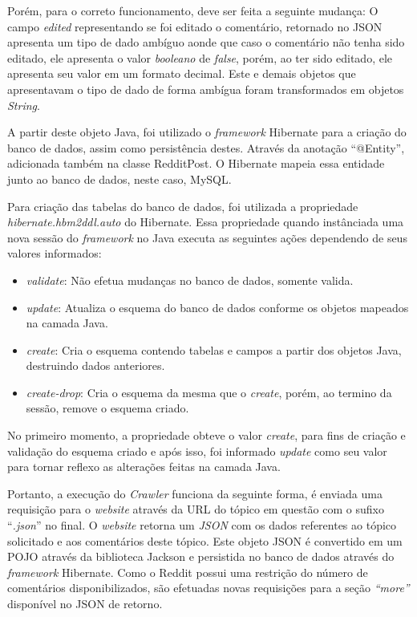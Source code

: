Porém, para o correto funcionamento, deve ser feita a seguinte mudança: O campo
\textit{edited} representando se foi editado o comentário, retornado no
\ac{JSON} apresenta um tipo de dado ambíguo aonde que caso o comentário não tenha sido editado, ele apresenta o valor \textit{booleano} de \textit{false}, porém, ao ter sido editado, ele apresenta
seu valor em um formato decimal. Este e demais objetos que apresentavam o tipo
de dado de forma ambígua foram transformados em objetos \textit{String}.


A partir deste objeto Java, foi utilizado o \textit{framework} Hibernate para a
criação do banco de dados, assim como persistência destes. Através da anotação
``@Entity'', adicionada também na classe RedditPost. O Hibernate mapeia essa
entidade junto ao banco de dados, neste caso, MySQL.

Para criação das tabelas do banco de dados, foi utilizada a propriedade
\textit{hibernate.hbm2ddl.auto} do Hibernate. Essa propriedade quando
instânciada uma nova sessão do \textit{framework} no Java executa as seguintes
ações dependendo de seus valores informados:


\begin{itemize}
  \item \textit{validate}: Não efetua mudanças no banco de dados, somente
  valida.
  \item \textit{update}: Atualiza o esquema do banco de dados conforme os
  objetos mapeados na camada Java.
  \item \textit{create}: Cria o esquema contendo tabelas e campos a partir dos
  objetos Java, destruindo dados anteriores.
  \item \textit{create-drop}: Cria o esquema da mesma que o \textit{create},
  porém, ao termino da sessão, remove o esquema criado.
\end{itemize}

No primeiro momento, a propriedade obteve o valor \textit{create}, para fins de
criação e validação do esquema criado e após isso, foi informado \textit{update}
como seu valor para tornar reflexo as alterações feitas na camada Java.

Portanto, a execução do \textit{Crawler} funciona da seguinte forma, é enviada
uma requisição para o \textit{website} através da URL do tópico em questão com o
sufixo ``\textit{.json}'' no final. O \textit{website} retorna um
\textit{JSON} com os dados referentes ao tópico solicitado e aos comentários
deste tópico. Este objeto \ac{JSON} é convertido em um \ac{POJO} através da
biblioteca Jackson e persistida no banco de dados através do \textit{framework}
Hibernate. Como o Reddit possui uma restrição do número de comentários
disponibilizados, são efetuadas novas requisições para a seção \textit{``more''}
disponível no \ac{JSON} de retorno.


